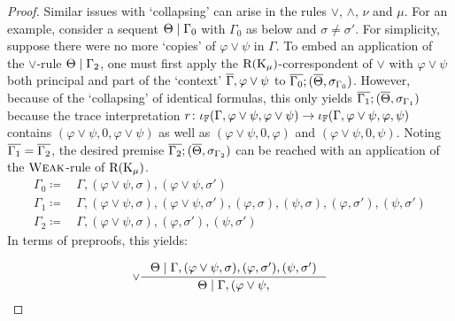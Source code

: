 \begin{proof}
  Similar issues with `collapsing' can arise in the rules $\vee$, $\wedge$,
  $\nu$ and $\mu$.
  For an example, consider a sequent $\Theta \mid \Gamma_0$ with $\Gamma_0$ as below and $\sigma \neq
  \sigma'$. For simplicity, suppose there were no more `copies' of $\varphi \vee
  \psi$ in $\Gamma$. To embed an application of the $\vee$-rule $\Theta \mid \Gamma_2$,
  one must first apply the $\mathrm{R}(\mathrm{K}_\mu)$-correspondent of $\vee$ with $\varphi \vee
  \psi$ both principal and part of the `context' $\overline{\Gamma}, \varphi \vee \psi$ to
  $\overline{\Gamma_0} ; (\overline{\Theta}, \sigma_{\Gamma_0})$.
  However, because of the `collapsing' of identical formulas, this only yields
  $\overline{\Gamma_1} ; (\overline{\Theta}, \sigma_{\Gamma_1})$ because the trace
  interpretation $r \colon \iota_{\mathbb{F}}(\Gamma, \varphi \vee \psi, \varphi \vee \psi)
  \to \iota_{\mathbb{F}}(\Gamma, \varphi \vee \psi, \varphi, \psi)$ contains
  $(\varphi \vee \psi, 0, \varphi \vee \psi)$ as well as $(\varphi \vee \psi, 0,
  \varphi)$ and $(\varphi \vee \psi, 0, \psi)$. Noting $\overline{\Gamma_1} =
  \overline{\Gamma_2}$, the desired premise $\overline{\Gamma_2} ; (\overline{\Theta},
  \sigma_{\Gamma_2})$ can be reached with an application of the $\textsc{Weak}$-rule of $\mathrm{R}(\mathrm{K}_\mu)$.
  \begin{align*}
    \Gamma_0 \coloneq\,& \Gamma, (\varphi \vee \psi, \sigma), (\varphi \vee \psi, \sigma') \\
    \Gamma_1 \coloneq\,& \Gamma, (\varphi \vee \psi, \sigma), (\varphi \vee \psi, \sigma'), (\varphi, \sigma), (\psi, \sigma), (\varphi, \sigma'), (\psi, \sigma') \\
    \Gamma_2 \coloneq\,& \Gamma, (\varphi \vee \psi, \sigma), (\varphi, \sigma'), (\psi, \sigma')
  \end{align*}
  In terms of preproofs, this yields:
  \begin{lrbox}{\mypt}%
    \begin{varwidth}{\linewidth}
      \begin{comfproof}
        \LSC{\RWeak}
        \LSC{$\vee$}
      \end{comfproof}
    \end{varwidth}
  \end{lrbox}
  \[
    \inference[$\vee$]{\Theta \rsep \Gamma, (\varphi \vee \psi, \sigma),
      (\varphi, \sigma'), (\psi, \sigma')}{\Theta \rsep \Gamma, (\varphi \vee \psi,
}\]
\end{proof}
